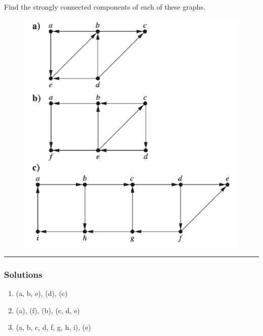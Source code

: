 \newpage
\begin{question}
Find the strongly connected components of each of these graphs.

\begin{figure}[htb!]
  \centering
  \includegraphics[width=0.4\linewidth]{q5_figure.pdf}
\end{figure}

\end{question}

\par\noindent\rule{\textwidth}{0.5pt}

\subsubsection*{Solutions}
\begin{enumerate}[label=\textbf{\alph*).}]
  \item (a, b, e), (d), (c)
  \item (a), (f), (b), (c, d, e)
  \item (a, b, c, d, f, g, h, i), (e)

\end{enumerate}